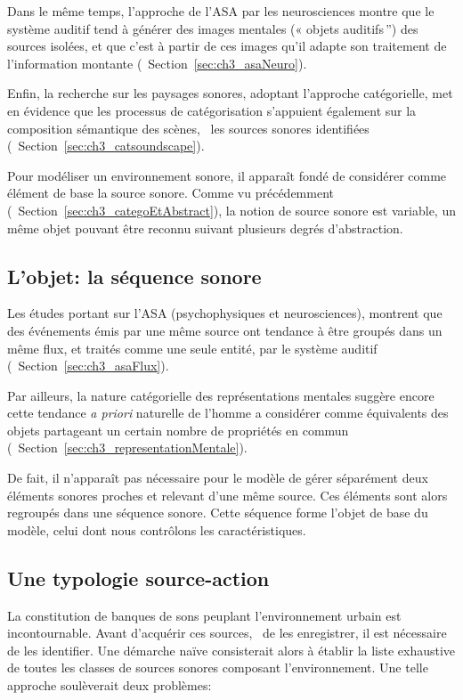 Dans le même temps, l'approche de l'ASA par les neurosciences montre que le système auditif tend à générer des images mentales (« objets auditifs\,'') des sources isolées, et que c'est à partir de ces images qu'il adapte son traitement de l'information montante (\cf~Section~\ref{sec:ch3_asaNeuro}).

Enfin, la recherche sur les paysages sonores, adoptant l’approche catégorielle, met en évidence que les processus de catégorisation s'appuient également sur la composition sémantique des scènes, \ie~les sources sonores identifiées (\cf~Section~\ref{sec:ch3_catsoundscape}). 

Pour modéliser un environnement sonore, il apparaît fondé de considérer comme élément de base la source sonore. Comme vu précédemment (\cf~Section~\ref{sec:ch3_categoEtAbstract}), la notion de source sonore est variable, un même objet pouvant être reconnu suivant plusieurs degrés d'abstraction.

\subsection{L'objet: la séquence sonore}

Les études portant sur l'ASA (psychophysiques et neurosciences), montrent que des événements émis par une même source ont tendance à être groupés dans un même flux, et traités comme une seule entité, par le système auditif (\cf~Section~\ref{sec:ch3_asaFlux}).

Par ailleurs, la nature catégorielle des représentations mentales suggère encore cette tendance \emph{a priori} naturelle de l'homme a considérer comme équivalents des objets partageant un certain nombre de propriétés en commun (\cf~Section~\ref{sec:ch3_representationMentale}).

De fait, il n'apparaît pas nécessaire pour le modèle de gérer séparément deux éléments sonores proches et relevant d'une même source. Ces éléments sont alors regroupés dans une séquence sonore. Cette séquence forme l'objet de base du modèle, celui dont nous contrôlons les caractéristiques. 

\subsection{Une typologie source-action}
\label{sec:ch4_sourceAction}

La constitution de banques de sons peuplant l'environnement urbain est incontournable. Avant d'acquérir ces sources, \ie~de les enregistrer, il est nécessaire de les identifier. Une démarche naïve consisterait alors à établir la liste exhaustive de toutes les classes de sources sonores composant l'environnement. Une telle approche soulèverait deux problèmes:

